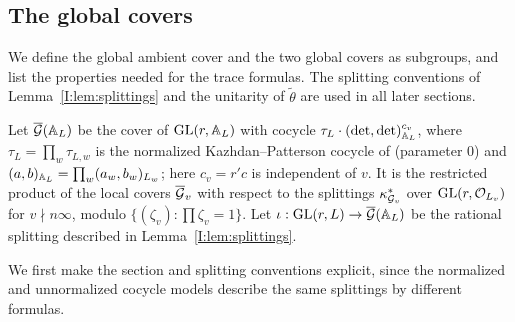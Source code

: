\subsection{The global covers}\label{I:subsec:globalcovers}
We define the global ambient cover and the two global covers as subgroups, and list the properties needed for the trace formulas. The splitting conventions of Lemma~\ref{I:lem:splittings} and the unitarity of $\tilde\theta$ are used in all later sections.

Let $\overline{\mathcal{G}}(\mathbb{A}_L)$ be the cover of $\mathrm{GL}(r,\mathbb{A}_L)$ with cocycle $\tau_L\cdot(\det,\det)_{\mathbb{A}_L}^{c_v}$, where $\tau_L=\prod_w\tau_{L,w}$ is the normalized Kazhdan--Patterson cocycle of \cite[\S2]{FK86} (parameter $0$) and $(a,b)_{\mathbb{A}_L}=\prod_w(a_w,b_w)_{L_w}$; here $c_v=r'c$ is independent of $v$. It is the restricted product of the local covers $\overline{\mathcal{G}}_v$ with respect to the splittings $\kappa^{*}_{\mathcal{G}_v}$ over $\mathrm{GL}(r,\mathcal{O}_{L_v})$ for $v\nmid n\infty$, modulo $\{(\zeta_v):\prod\zeta_v=1\}$. Let $\iota:\mathrm{GL}(r,L)\to\overline{\mathcal{G}}(\mathbb{A}_L)$ be the rational splitting described in Lemma~\ref{I:lem:splittings}.

We first make the section and splitting conventions explicit, since the normalized and unnormalized cocycle models describe the same splittings by different formulas.

